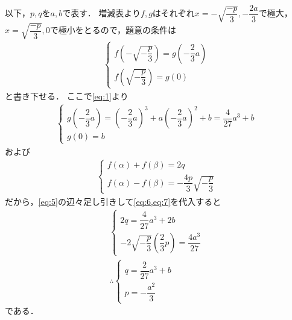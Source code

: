 \documentclass[../../main.tex]{subfiles}
\begin{document}
以下，$p, q$を$a, b$で表す．
増減表より$f, g$はそれぞれ$x=-\sqrt{\dfrac{-p}{3}},-\dfrac{2a}{3}$で極大，$x=\sqrt{\dfrac{-p}{3}}, 0$で極小をとるので，題意の条件は
\begin{align}
  \begin{cases}
    f\left(-\sqrt{-\dfrac{p}{3}}\right) = g\left(-\dfrac{2}{3}a\right) \\
    f\left(\sqrt{-\dfrac{p}{3}}\right)  = g\left(0\right)
  \end{cases} \label{eq:5}
\end{align}
と書き下せる．
ここで\cref{eq:1}より
\begin{align}
  \begin{cases}
    g\left(-\dfrac{2}{3}a\right) = (-\dfrac{2}{3}a)^3 + a(-\dfrac{2}{3}a)^2 + b = \dfrac{4}{27}a^3 + b \\
    g(0) = b
  \end{cases} \label{eq:6}
\end{align}
および
\begin{align}
  \begin{cases}
    f(\alpha) + f(\beta) = 2q \\
    f(\alpha) - f(\beta) = -\dfrac{4p}{3}\sqrt{-\dfrac{p}{3}}
  \end{cases} \label{eq:7}
\end{align}
だから，\cref{eq:5}の辺々足し引きして\cref{eq:6,eq:7}を代入すると
\begin{align}
  \begin{cases}
    2q = \dfrac{4}{27}a^3 + 2b \\
    -2\sqrt{-\dfrac{p}{3}} (\dfrac{2}{3}p) = \dfrac{4a^3}{27}
  \end{cases} \\
  \therefore
  \begin{cases}
    q = \dfrac{2}{27}a^3 + b \\
    p = -\dfrac{a^2}{3}
  \end{cases}
\end{align}
である．

\newpage
\end{document}
